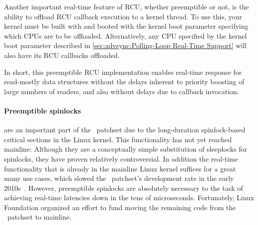 \QuickQuizEnd

Another important real-time feature of RCU, whether preemptible or
not, is the ability to offload RCU callback execution to a kernel
thread.
To use this, your kernel must be built with 
and booted with the  kernel boot parameter specifying
which CPUs are to be offloaded.
Alternatively, any CPU specified by the  kernel boot parameter
described in
\cref{sec:advsync:Polling-Loop Real-Time Support}
will also have its RCU callbacks offloaded.

In short, this preemptible RCU implementation enables real-time response for
read-mostly data structures without the delays inherent to priority
boosting of large numbers of readers, and also without delays due to
callback invocation.

\paragraph{Preemptible spinlocks}
are an important part of the \rt\ patchset due to the long-duration
spinlock-based critical sections in the Linux kernel.
This functionality has not yet reached mainline:
Although they are a conceptually simple substitution of sleeplocks
for spinlocks, they have proven relatively controversial.
In addition the real-time functionality that is already in the mainline
Linux kernel suffices for a great many use cases, which slowed the \rt\
patchset's development rate in the early
2010s~\cite{JakeEdge2013Future-rtLinux,JakeEdge2014Future-rtLinux}.
However, preemptible spinlocks are absolutely necessary to the task of
achieving real-time latencies down in the tens of microseconds.
Fortunately, Linux Foundation organized an effort to fund moving the
remaining code from the \rt\ patchset to mainline.


